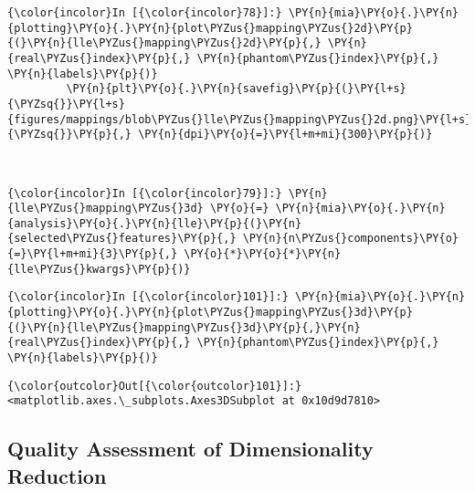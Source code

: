     \begin{Verbatim}[commandchars=\\\{\}]
{\color{incolor}In [{\color{incolor}78}]:} \PY{n}{mia}\PY{o}{.}\PY{n}{plotting}\PY{o}{.}\PY{n}{plot\PYZus{}mapping\PYZus{}2d}\PY{p}{(}\PY{n}{lle\PYZus{}mapping\PYZus{}2d}\PY{p}{,} \PY{n}{real\PYZus{}index}\PY{p}{,} \PY{n}{phantom\PYZus{}index}\PY{p}{,} \PY{n}{labels}\PY{p}{)}
         \PY{n}{plt}\PY{o}{.}\PY{n}{savefig}\PY{p}{(}\PY{l+s}{\PYZsq{}}\PY{l+s}{figures/mappings/blob\PYZus{}lle\PYZus{}mapping\PYZus{}2d.png}\PY{l+s}{\PYZsq{}}\PY{p}{,} \PY{n}{dpi}\PY{o}{=}\PY{l+m+mi}{300}\PY{p}{)}
\end{Verbatim}

    \begin{center}
    \end{center}
    { \hspace*{\fill} \\}

    \begin{Verbatim}[commandchars=\\\{\}]
{\color{incolor}In [{\color{incolor}79}]:} \PY{n}{lle\PYZus{}mapping\PYZus{}3d} \PY{o}{=} \PY{n}{mia}\PY{o}{.}\PY{n}{analysis}\PY{o}{.}\PY{n}{lle}\PY{p}{(}\PY{n}{selected\PYZus{}features}\PY{p}{,} \PY{n}{n\PYZus{}components}\PY{o}{=}\PY{l+m+mi}{3}\PY{p}{,} \PY{o}{*}\PY{o}{*}\PY{n}{lle\PYZus{}kwargs}\PY{p}{)}
\end{Verbatim}

    \begin{Verbatim}[commandchars=\\\{\}]
{\color{incolor}In [{\color{incolor}101}]:} \PY{n}{mia}\PY{o}{.}\PY{n}{plotting}\PY{o}{.}\PY{n}{plot\PYZus{}mapping\PYZus{}3d}\PY{p}{(}\PY{n}{lle\PYZus{}mapping\PYZus{}3d}\PY{p}{,}\PY{n}{real\PYZus{}index}\PY{p}{,} \PY{n}{phantom\PYZus{}index}\PY{p}{,} \PY{n}{labels}\PY{p}{)}
\end{Verbatim}

            \begin{Verbatim}[commandchars=\\\{\}]
{\color{outcolor}Out[{\color{outcolor}101}]:} <matplotlib.axes.\_subplots.Axes3DSubplot at 0x10d9d7810>
\end{Verbatim}

    \subsection{Quality Assessment of Dimensionality
Reduction}\label{quality-assessment-of-dimensionality-reduction}

